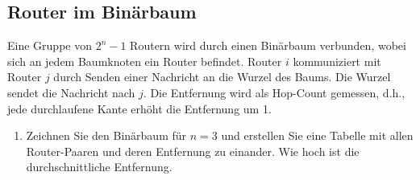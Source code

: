 \setcounter{section}{1}
\setcounter{subsection}{6} %
\subsection{Router im Binärbaum}

Eine Gruppe von $2^n - 1$ Routern wird durch einen Binärbaum verbunden, wobei
sich an jedem Baumknoten ein Router befindet. Router $i$ kommuniziert mit
Router $j$ durch Senden einer Nachricht an die Wurzel des Baums. Die Wurzel
sendet die Nachricht nach $j$. Die Entfernung wird als Hop-Count gemessen,
d.h., jede durchlaufene Kante erhöht die Entfernung um 1.

\begin{enumerate}
    \item Zeichnen Sie den Binärbaum für $n = 3$ und erstellen Sie eine Tabelle
        mit allen Router-Paaren und deren Entfernung zu einander. Wie hoch ist
        die durchschnittliche Entfernung.


\end{enumerate}
